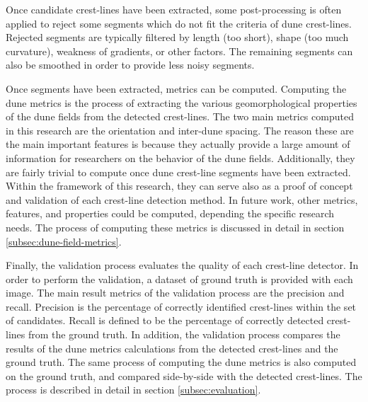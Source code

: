 Once candidate crest-lines have been extracted, some post-processing is often applied to reject some segments which do not fit the criteria of dune crest-lines. Rejected segments are typically filtered by length (too short), shape (too much curvature), weakness of gradients, or other factors. The remaining segments can also be smoothed in order to provide less noisy segments.

Once segments have been extracted, metrics can be computed. Computing the dune metrics is the process of extracting the various geomorphological properties of the dune fields from the detected crest-lines. The two main metrics computed in this research are the orientation and inter-dune spacing. The reason these are the main important features is because they actually provide a large amount of information for researchers on the behavior of the dune fields. Additionally, they are fairly trivial to compute once dune crest-line segments have been extracted. Within the framework of this research, they can serve also as a proof of concept and validation of each crest-line detection method. In future work, other metrics, features, and properties could be computed, depending the specific research needs. The process of computing these metrics is discussed in detail in section \ref{subsec:dune-field-metrics}.

Finally, the validation process evaluates the quality of each crest-line detector. In order to perform the validation, a dataset of ground truth is provided with each image. The main result metrics of the validation process are the precision and recall. Precision is the percentage of correctly identified crest-lines within the set of candidates. Recall is defined to be the percentage of correctly detected crest-lines from the ground truth. In addition, the validation process compares the results of the dune metrics calculations from the detected crest-lines and the ground truth. The same process of computing the dune metrics is also computed on the ground truth, and compared side-by-side with the detected crest-lines. The process is described in detail in section \ref{subsec:evaluation}.


